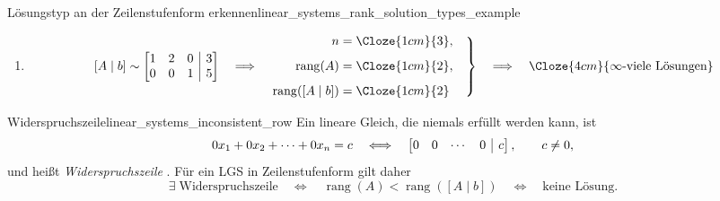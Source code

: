 \begin{ExampleBox}{Lösungstyp an der Zeilenstufenform erkennen}{linear_systems_rank_solution_types_example}
\begin{enumerate}[label=\alph*),leftmargin=1.8em,itemsep=1.3em]
    \item
      \[
        [A\mid b]\sim
        \left[
          \begin{array}{@{}rrr|r@{}}
            1&2&0&3\\
            0&0&1&5
          \end{array}
        \right]
        \quad\Longrightarrow\quad
        \left.
        \begin{aligned}
          n&=\Cloze{1cm}{3},\\[0.5em]
          \operatorname{rang}(A)&=\Cloze{1cm}{2},\\[0.5em]
          \operatorname{rang}([A\mid b])&=\Cloze{1cm}{2}
        \end{aligned}
        \quad\right\}
        \quad\Longrightarrow\quad
        \Cloze{4cm}{\infty\text{-viele Lösungen}}
      \]
  \end{enumerate}
\end{ExampleBox}


\begin{KeyPointBox}{Widerspruchszeile}{linear_systems_inconsistent_row}
  Ein lineare Gleich, die niemals erfüllt werden kann, ist
  \[
    0x_1+0x_2+\dots+0x_n=c
    \quad\Longleftrightarrow\quad
    \left[\begin{array}{@{}cccc|c@{}}
      0&0&\cdots&0&c
    \end{array}\right],
    \qquad c\neq0,
  \]
  und heißt \emph{Widerspruchszeile} . 
  Für ein LGS in Zeilenstufenform gilt daher
  \[
    \exists\;\text{Widerspruchszeile}
    \quad\Longleftrightarrow\quad
    \operatorname{rang}(A)<\operatorname{rang}([A\mid b])
    \quad\Longleftrightarrow\quad
    \text{keine Lösung}.
  \]
\end{KeyPointBox}


